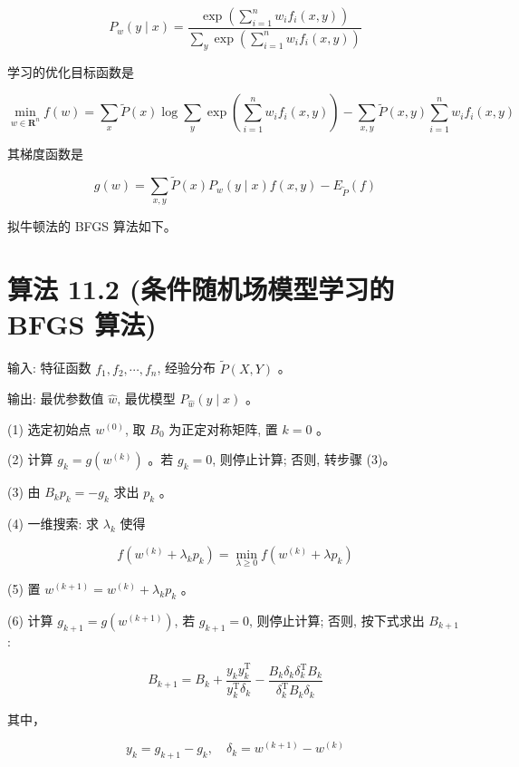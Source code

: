\documentclass[10pt]{article}
\begin{document}
\begin{CJK*}{UTF8}{bsmi}
\begin{equation*}
P_{w}(y \mid x)=\frac{\exp \left(\sum_{i=1}^{n} w_{i} f_{i}(x, y)\right)}{\sum_{y} \exp \left(\sum_{i=1}^{n} w_{i} f_{i}(x, y)\right)} \tag{11.49}
\end{equation*}


学习的优化目标函数是


\begin{equation*}
\min _{w \in \boldsymbol{R}^{n}} f(w)=\sum_{x} \tilde{P}(x) \log \sum_{y} \exp \left(\sum_{i=1}^{n} w_{i} f_{i}(x, y)\right)-\sum_{x, y} \tilde{P}(x, y) \sum_{i=1}^{n} w_{i} f_{i}(x, y) \tag{11.50}
\end{equation*}


其梯度函数是


\begin{equation*}
g(w)=\sum_{x, y} \tilde{P}(x) P_{w}(y \mid x) f(x, y)-E_{\tilde{P}}(f) \tag{11.51}
\end{equation*}


拟牛顿法的 BFGS 算法如下。

\section*{算法 11.2 (条件随机场模型学习的 BFGS 算法)}
输入: 特征函数 $f_{1}, f_{2}, \cdots, f_{n}$, 经验分布 $\tilde{P}(X, Y)$ 。

输出: 最优参数值 $\hat{w}$, 最优模型 $P_{\hat{w}}(y \mid x)$ 。

(1) 选定初始点 $w^{(0)}$, 取 $B_{0}$ 为正定对称矩阵, 置 $k=0$ 。

(2) 计算 $g_{k}=g\left(w^{(k)}\right)$ 。若 $g_{k}=0$, 则停止计算; 否则, 转步骤 (3)。

(3) 由 $B_{k} p_{k}=-g_{k}$ 求出 $p_{k}$ 。

(4) 一维搜索: 求 $\lambda_{k}$ 使得

$$
f\left(w^{(k)}+\lambda_{k} p_{k}\right)=\min _{\lambda \geqslant 0} f\left(w^{(k)}+\lambda p_{k}\right)
$$

(5) 置 $w^{(k+1)}=w^{(k)}+\lambda_{k} p_{k}$ 。

(6) 计算 $g_{k+1}=g\left(w^{(k+1)}\right)$, 若 $g_{k+1}=0$, 则停止计算; 否则, 按下式求出 $B_{k+1}$ :

$$
B_{k+1}=B_{k}+\frac{y_{k} y_{k}^{\mathrm{T}}}{y_{k}^{\mathrm{T}} \delta_{k}}-\frac{B_{k} \delta_{k} \delta_{k}^{\mathrm{T}} B_{k}}{\delta_{k}^{\mathrm{T}} B_{k} \delta_{k}}
$$

其中，

$$
y_{k}=g_{k+1}-g_{k}, \quad \delta_{k}=w^{(k+1)}-w^{(k)}
$$


\end{CJK*}
\end{document}
